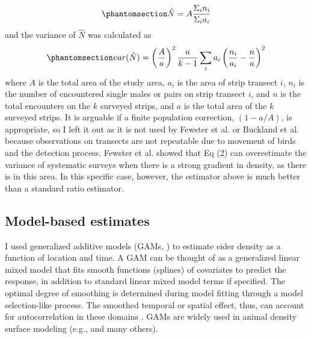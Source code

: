 \documentclass[
  10pt,
  letterpaper,
]{article}
\begin{document}
\begin{equation}\phantomsection\label{eq-1}{\hat N = A \frac{\Sigma_i n_i}{\Sigma_i a_i}}\end{equation}
and the variance of \(\hat N\) was calculated as
\begin{equation}\phantomsection\label{eq-2}{var(\hat N) = \left( \frac{A}{a} \right)^2 \frac{a}{k-1} \sum_i a_i\left( \frac{n_i}{a_i} - \frac{n}{a} \right)^2}\end{equation}
where \(A\) is the total area of the study area, \(a_i\) is the area of
strip transect \(i\), \(n_i\) is the number of encountered single males
or pairs on strip transect \(i\), and \(n\) is the total encounters on
the \(k\) surveyed strips, and \(a\) is the total area of the \(k\)
surveyed strips. It is arguable if a finite population correction,
\((1 - a/A)\), is appropriate, so I left it out as it is not used by
Fewster et al. \citep{fewster2009} or Buckland et al.
\citep{buckland2001} because observations on transects are not
repeatable due to movement of birds and the detection process. Fewster
et al. \citep{fewster2009} showed that Eq (2) can overestimate the
variance of systematic surveys when there is a strong gradient in
density, as there is in this area. In this specific case, however, the estimator above is much better than a standard ratio estimator.

\subsection{Model-based estimates}\label{model-based-estimates}

I used generalized additive models (GAMs, \citep{hastie1986generalized, wood2017, pedersen2019hierarchical}) to estimate eider density as a function of location and time. A GAM can be thought of as a generalized linear mixed model that fits smooth functions (splines) of covariates to predict the response, in addition to standard linear mixed model terms if specified. The optimal degree of smoothing is determined during model fitting through a model selection-like process. The smoothed temporal or spatial effect, thus, can account for autocorrelation in these domains \citep{wood2017, pedersen2019hierarchical, hefley2017basis}. GAMs are
widely used in animal density surface modeling (e.g., \citep{miller2013, amundson2019, hollmen2023climate} and many others).
\end{document}
